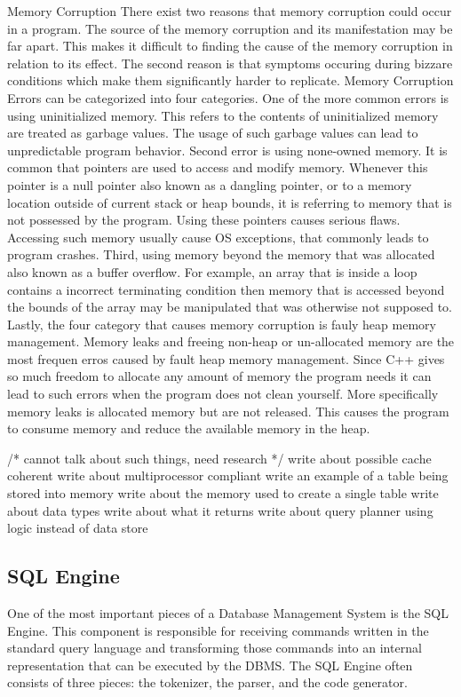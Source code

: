 \documentclass[letterpaper, 12pt]{article}
\begin{document}
	Memory Corruption
		There exist two reasons that memory corruption could occur in a program. The source of the memory corruption and its manifestation may be far apart. This makes it difficult to finding the cause of the memory corruption in relation to its effect. The second reason is that symptoms occuring during bizzare conditions which make them significantly harder to replicate. Memory Corruption Errors can be categorized into four categories. One of the more common errors is using uninitialized memory. This refers to the contents of uninitialized memory are treated as garbage values. The usage of such garbage values can lead to unpredictable program behavior. Second error is using none-owned memory. It is common that pointers are used to access and modify memory. Whenever this pointer is a null pointer also known as a dangling pointer, or to a memory location outside of current stack or heap bounds, it is referring to memory that is not possessed by the program. Using these pointers causes serious flaws. Accessing such memory usually cause OS exceptions, that commonly leads to program crashes. Third, using memory beyond the memory that was allocated also known as a buffer overflow. For example, an array that is inside a loop contains a incorrect terminating condition then memory that is accessed beyond the bounds of the array may be manipulated that was otherwise not supposed to. Lastly, the four category that causes memory corruption is fauly heap memory management. Memory leaks and freeing non-heap or un-allocated memory are the most frequen erros caused by fault heap memory management. Since C++ gives so much freedom to allocate any amount of memory the program needs it can lead to such errors when the program does not clean yourself. More specifically memory leaks is allocated memory but are not released. This causes the program to consume memory and reduce the available memory in the heap. 

/* cannot talk about such things, need research */		
write about possible cache coherent
write about multiprocessor compliant
write an example of a table being stored into memory
write about the memory used to create a single table
write about data types
write about what it returns
write about query planner using logic instead of data store

\subsection{SQL Engine}
One of the most important pieces of a Database Management System is the SQL Engine. 
This component is responsible for receiving commands written in the standard query
language and transforming those commands into an internal representation that can be
executed by the DBMS. The SQL Engine often consists of three pieces: the tokenizer, the
parser, and the code generator.
\end{document}
